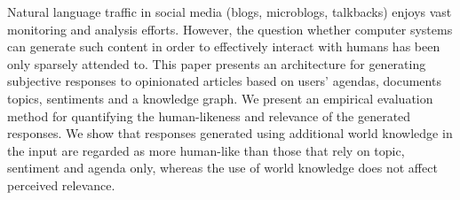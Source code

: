 Natural language traffic in social media (blogs, microblogs, talkbacks) enjoys vast monitoring and analysis efforts. However, the question whether computer systems can generate such content in order to effectively interact with humans has been only sparsely attended to. This paper presents an architecture for generating subjective responses to opinionated articles based on users' agendas, documents topics, sentiments and a knowledge graph. We present an empirical evaluation method for quantifying the human-likeness and relevance of the generated responses. We show that responses generated using additional world knowledge in the input are regarded as more human-like than those that rely on topic, sentiment and agenda only, whereas the use of world knowledge does not affect perceived relevance.
